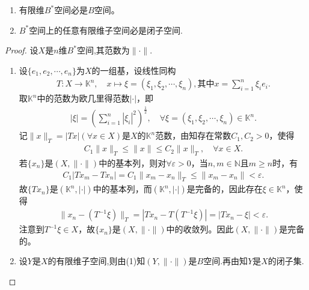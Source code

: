 \documentclass[../../main.tex]{subfiles}%
\begin{document}
\begin{corollary}
\begin{enumerate}[(1)]
\item 有限维$B^*$空间必是$B$空间。

\item $B^*$空间上的任意有限维子空间必是闭子空间.
\end{enumerate}
\end{corollary}
\begin{proof}

设$X$是$n$维$B^*$空间,其范数为$\|\cdot \|$.
\begin{enumerate}[(1)]
\item 设$\{ e_1,e_2,\cdots,e_n \}$为$X$的一组基，设线性同构
\begin{align*}
T:X\rightarrow \mathbb{K} ^n,\quad x\mapsto \xi = (\xi _1,\xi _2,\cdots,\xi _n),\text{其中}x=\sum\limits_{i=1}^n \xi _ie_i.
\end{align*}
取$\mathbb{K} ^n$中的范数为欧几里得范数$|\cdot|$，即
\begin{align*}
|\xi|=\left( \sum\limits_{i=1}^n |\xi _i|^2 \right) ^{\frac{1}{2}},\quad \forall \xi = (\xi _1,\xi _2,\cdots,\xi _n) \in \mathbb{K} ^n.
\end{align*}
记$\| x \|_T=|Tx|(\forall x\in X)$是$X$的$\mathbb{K} ^n$范数，由知存在常数$C_1,C_2>0$，使得
\begin{align*}
C_1\| x \|_T\leqslant \| x \| \leqslant C_2\| x \|_T,\quad \forall x\in X.
\end{align*}
若$\{ x_n \}$是$( X,\|\cdot\| )$中的基本列，则对$\forall \varepsilon >0$，当$n,m\in \mathbb{N}$且$m\geqslant n$时，有
\begin{align*}
C_1|Tx_m-Tx_n|=C_1\| x_m-x_n \|_T\leqslant \| x_m-x_n \| <\varepsilon .
\end{align*}
故$\{ Tx_n \}$是$( \mathbb{K} ^n,|\cdot| )$中的基本列，而$( \mathbb{K} ^n,|\cdot| )$是完备的，因此存在$\xi \in \mathbb{K} ^n$，使得
\begin{align*}
\| x_n-(T^{-1}\xi) \|_T=|Tx_n-T(T^{-1}\xi)|=|Tx_n-\xi|<\varepsilon .
\end{align*}
注意到$T^{-1}\xi \in X$，故$\{ x_n \}$是$( X,\|\cdot\| )$中的收敛列。因此$( X,\|\cdot\| )$是完备的。

\item 设$Y$是$X$的有限维子空间,则由(1)知$(Y,\|\cdot \|)$是$B$空间.再由知$Y$是$X$的闭子集.
\end{enumerate}
\end{proof}
\end{document}
